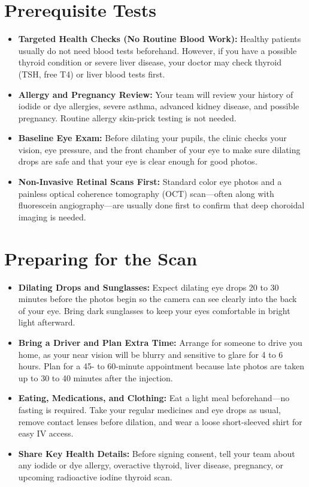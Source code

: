 \section{Prerequisite Tests}

\begin{itemize}
    \item \textbf{Targeted Health Checks (No Routine Blood Work):} Healthy patients usually do not need blood tests beforehand. However, if you have a possible thyroid condition or severe liver disease, your doctor may check thyroid (TSH, free T4) or liver blood tests first.
    \item \textbf{Allergy and Pregnancy Review:} Your team will review your history of iodide or dye allergies, severe asthma, advanced kidney disease, and possible pregnancy. Routine allergy skin-prick testing is not needed.
    \item \textbf{Baseline Eye Exam:} Before dilating your pupils, the clinic checks your vision, eye pressure, and the front chamber of your eye to make sure dilating drops are safe and that your eye is clear enough for good photos.
    \item \textbf{Non-Invasive Retinal Scans First:} Standard color eye photos and a painless optical coherence tomography (OCT) scan---often along with fluorescein angiography---are usually done first to confirm that deep choroidal imaging is needed.
\end{itemize}

\section{Preparing for the Scan}

\begin{itemize}
    \item \textbf{Dilating Drops and Sunglasses:} Expect dilating eye drops 20 to 30 minutes before the photos begin so the camera can see clearly into the back of your eye. Bring dark sunglasses to keep your eyes comfortable in bright light afterward.
    \item \textbf{Bring a Driver and Plan Extra Time:} Arrange for someone to drive you home, as your near vision will be blurry and sensitive to glare for 4 to 6 hours. Plan for a 45- to 60-minute appointment because late photos are taken up to 30 to 40 minutes after the injection.
    \item \textbf{Eating, Medications, and Clothing:} Eat a light meal beforehand---no fasting is required. Take your regular medicines and eye drops as usual, remove contact lenses before dilation, and wear a loose short-sleeved shirt for easy IV access.
    \item \textbf{Share Key Health Details:} Before signing consent, tell your team about any iodide or dye allergy, overactive thyroid, liver disease, pregnancy, or upcoming radioactive iodine thyroid scan.
\end{itemize}

